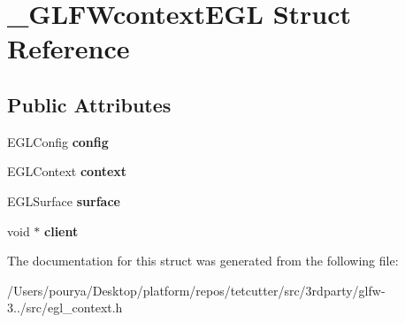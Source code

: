 \hypertarget{struct__GLFWcontextEGL}{}\section{\+\_\+\+G\+L\+F\+Wcontext\+E\+G\+L Struct Reference}
\label{struct__GLFWcontextEGL}
\subsection*{Public Attributes}
\begin{DoxyCompactItemize}
\item 
\hypertarget{struct__GLFWcontextEGL_ae29fb1e5ab2ab77ea982e54a75378da4}{}E\+G\+L\+Config {\bfseries config}\label{struct__GLFWcontextEGL_ae29fb1e5ab2ab77ea982e54a75378da4}

\item 
\hypertarget{struct__GLFWcontextEGL_a3bf8020ff3ff82c6139b2f519462bf31}{}E\+G\+L\+Context {\bfseries context}\label{struct__GLFWcontextEGL_a3bf8020ff3ff82c6139b2f519462bf31}

\item 
\hypertarget{struct__GLFWcontextEGL_a35a0a681126254ba61a7754090619f98}{}E\+G\+L\+Surface {\bfseries surface}\label{struct__GLFWcontextEGL_a35a0a681126254ba61a7754090619f98}

\item 
\hypertarget{struct__GLFWcontextEGL_ab03af415be57b433f3a1e2d2e532b068}{}void $\ast$ {\bfseries client}\label{struct__GLFWcontextEGL_ab03af415be57b433f3a1e2d2e532b068}

\end{DoxyCompactItemize}


The documentation for this struct was generated from the following file\+:\begin{DoxyCompactItemize}
\item 
/\+Users/pourya/\+Desktop/platform/repos/tetcutter/src/3rdparty/glfw-\/3../src/egl\+\_\+context.\+h\end{DoxyCompactItemize}
